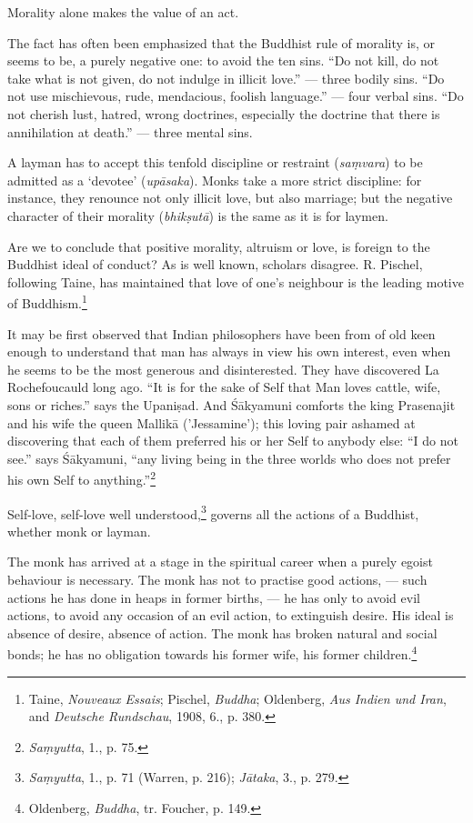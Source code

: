 \documentclass[a4paper, 11pt, oneside, english]{article}
\begin{document}
Morality alone makes the value of an act.

The fact has often been emphasized that the Buddhist rule of morality is, or seems to be, a purely negative one: to avoid the ten sins. ``Do not kill, do not take what is not given, do not indulge in illicit love.'' --- three bodily sins. ``Do not use mischievous, rude, mendacious, foolish language.'' --- four verbal sins. ``Do not cherish lust, hatred, wrong doctrines, especially the doctrine that there is annihilation at death.'' --- three mental sins.

A layman has to accept this tenfold discipline or restraint (\emph{saṃvara}) to be admitted as a `devotee' (\emph{upāsaka}). Monks take a more strict discipline: for instance, they renounce not only illicit love, but also marriage; but the negative character of their morality (\emph{bhikṣutā}) is the same as it is for laymen.

Are we to conclude that positive morality, altruism or love, is foreign to the Buddhist ideal of conduct? As is well known, scholars disagree. R. Pischel, following Taine, has maintained that love of one's neighbour is the leading motive of Buddhism.\footnote{Taine, \emph{Nouveaux Essais}; Pischel, \emph{Buddha}; Oldenberg, \emph{Aus Indien und Iran}, and \emph{Deutsche Rundschau}, 1908, 6., p. 380.}

It may be first observed that Indian philosophers have been from of old keen enough to understand that man has always in view his own interest, even when he seems to be the most generous and disinterested. They have discovered La Rochefoucauld long ago. ``It is for the sake of Self that Man loves cattle, wife, sons or riches.'' says the Upaniṣad. And Śākyamuni comforts the king Prasenajit and his wife the queen Mallikā ('Jessamine'); this loving pair ashamed at discovering that each of them preferred his or her Self to anybody else: ``I do not see.'' says Śākyamuni, ``any living being in the three worlds who does not prefer his own Self to anything.''\footnote{\emph{Saṃyutta}, 1., p. 75.}

Self-love, self-love well understood,\footnote{\emph{Saṃyutta}, 1., p. 71 (Warren, p. 216); \emph{Jātaka}, 3., p. 279.} governs all the actions of a Buddhist, whether monk or layman.

The monk has arrived at a stage in the spiritual career when a purely egoist behaviour is necessary. The monk has not to practise good actions, --- such actions he has done in heaps in former births, --- he has only to avoid evil actions, to avoid any occasion of an evil action, to extinguish desire. His ideal is absence of desire, absence of action. The monk has broken natural and social bonds; he has no obligation towards his former wife, his former children.\footnote{Oldenberg, \emph{Buddha}, tr. Foucher, p. 149.}
\end{document}
